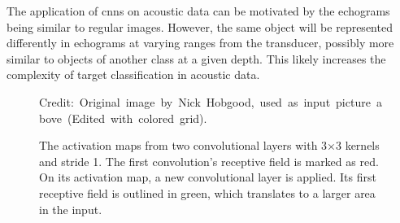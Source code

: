    The application of \gls{cnn}s on acoustic data can be motivated by the echograms being similar to regular images. However, the same object will be represented differently in echograms at varying ranges from the transducer, possibly more similar to objects of another class at a given depth\cite{simmonds2008fisheries}. This likely increases the complexity of target classification in acoustic data.
    
    \begin{figure}[H]
        \centering
        
        
        \caption[Receptive field]{The activation maps from two convolutional layers with 3×3 kernels and stride 1. The first convolution's receptive field is marked as red. On its activation map, a new convolutional layer is applied. Its first receptive field is outlined in green, which translates to a larger area in the input.}
      	\medskip 
        \hspace*{15pt}\hbox{\scriptsize Credit: Original image by Nick Hobgood\cite{clownfish_image}, used as input picture above (Edited with colored grid).}
        \label{receptive_field_fig}
    \end{figure}

    

